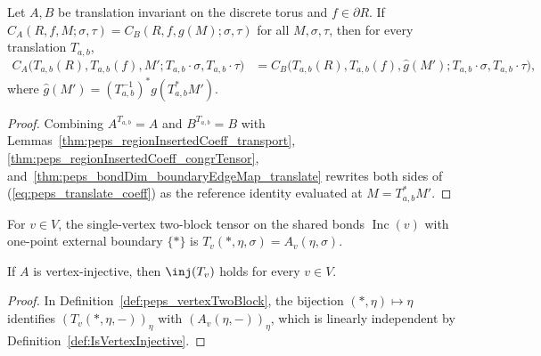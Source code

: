 \begin{lemma}%
    \label{thm:peps_regionInsertedCoeff_translate_coeffIdentity}
    \leanok
    Let $A,B$ be translation invariant on the discrete torus and $f\in\partial R$.
    If $C_A(R,f,M;\sigma,\tau)=C_B(R,f,g(M);\sigma,\tau)$ for all $M,\sigma,\tau$,
    then for every translation $T_{a,b}$,
    \begin{align}
        C_A\bigl(T_{a,b}(R),T_{a,b}(f),M';
        T_{a,b}\cdot\sigma,T_{a,b}\cdot\tau\bigr)
         & =
        C_B\bigl(T_{a,b}(R),T_{a,b}(f),
        \widehat{g}(M');
        T_{a,b}\cdot\sigma,T_{a,b}\cdot\tau\bigr),
        \label{eq:peps_translate_coeff}
    \end{align}
    where $\widehat{g}(M')=(T_{a,b}^{-1})^*g(T_{a,b}^*M')$.
\end{lemma}
\begin{proof}\leanok
    Combining $A^{T_{a,b}}=A$ and $B^{T_{a,b}}=B$ with
    Lemmas~\ref{thm:peps_regionInsertedCoeff_transport},
    \ref{thm:peps_regionInsertedCoeff_congrTensor},
    and~\ref{thm:peps_bondDim_boundaryEdgeMap_translate} rewrites both sides of
    (\ref{eq:peps_translate_coeff}) as the reference identity evaluated at
    $M=T_{a,b}^*M'$.
\end{proof}

\begin{definition}%
    \label{def:peps_vertexTwoBlock}
    \leanok
    For $v\in V$, the single-vertex two-block tensor on the shared bonds
    $\operatorname{Inc}(v)$ with one-point external boundary $\{*\}$ is
    $T_v(*,\eta,\sigma)=A_v(\eta,\sigma)$.
\end{definition}

\begin{lemma}%
    \label{thm:peps_isTwoBlockInjective_vertexTwoBlock}
    \leanok
    If $A$ is vertex-injective, then $\inj(T_v)$ holds for every $v\in V$.
\end{lemma}
\begin{proof}\leanok
    In Definition~\ref{def:peps_vertexTwoBlock}, the bijection $(*,\eta)\mapsto\eta$
    identifies $(T_v(*,\eta,-))_\eta$ with $(A_v(\eta,-))_\eta$, which is
    linearly independent by Definition~\ref{def:IsVertexInjective}.
\end{proof}

